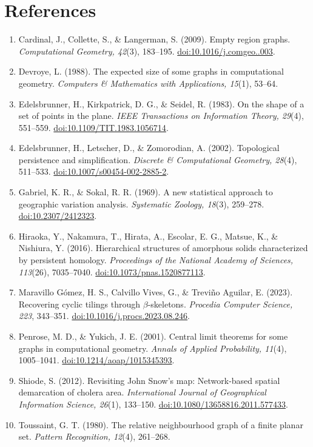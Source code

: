 \documentclass[10pt,letterpaper]{article}
\begin{document}
\section*{References}
{\footnotesize\setlength{\parskip}{1pt}
\begin{enumerate}\setlength{\itemsep}{1pt}\setlength{\parsep}{0pt}
\item Cardinal, J., Collette, S., \& Langerman, S. (2009). Empty region graphs. \emph{Computational Geometry, 42}(3), 183--195. \href{https://doi.org/10.1016/j.comgeo.2008.09.003}{doi:10.1016/j.comgeo..003}.
\item Devroye, L. (1988). The expected size of some graphs in computational geometry. \emph{Computers \& Mathematics with Applications, 15}(1), 53--64.
\item Edelsbrunner, H., Kirkpatrick, D. G., \& Seidel, R. (1983). On the shape of a set of points in the plane. \emph{IEEE Transactions on Information Theory, 29}(4), 551--559. \href{https://doi.org/10.1109/TIT.1983.1056714}{doi:10.1109/TIT.1983.1056714}.
\item Edelsbrunner, H., Letscher, D., \& Zomorodian, A. (2002). Topological persistence and simplification. \emph{Discrete \& Computational Geometry, 28}(4), 511--533. \href{https://doi.org/10.1007/s00454-002-2885-2}{doi:10.1007/s00454-002-2885-2}.
\item Gabriel, K. R., \& Sokal, R. R. (1969). A new statistical approach to geographic variation analysis. \emph{Systematic Zoology, 18}(3), 259--278. \href{https://doi.org/10.2307/2412323}{doi:10.2307/2412323}.
\item Hiraoka, Y., Nakamura, T., Hirata, A., Escolar, E. G., Matsue, K., \& Nishiura, Y. (2016). Hierarchical structures of amorphous solids characterized by persistent homology. \emph{Proceedings of the National Academy of Sciences, 113}(26), 7035--7040. \href{https://doi.org/10.1073/pnas.1520877113}{doi:10.1073/pnas.1520877113}.
\item Maravillo G\'omez, H. S., Calvillo Vives, G., \& Trevi\~no Aguilar, E. (2023). Recovering cyclic tilings through $\beta$-skeletons. \emph{Procedia Computer Science, 223}, 343--351. \href{https://doi.org/10.1016/j.procs.2023.08.246}{doi:10.1016/j.procs.2023.08.246}.
\item Penrose, M. D., \& Yukich, J. E. (2001). Central limit theorems for some graphs in computational geometry. \emph{Annals of Applied Probability, 11}(4), 1005--1041. \href{https://doi.org/10.1214/aoap/1015345393}{doi:10.1214/aoap/1015345393}.
\item Shiode, S. (2012). Revisiting John Snow's map: Network-based spatial demarcation of cholera area. \emph{International Journal of Geographical Information Science, 26}(1), 133--150. \href{https://doi.org/10.1080/13658816.2011.577433}{doi:10.1080/13658816.2011.577433}.
\item Toussaint, G. T. (1980). The relative neighbourhood graph of a finite planar set. \emph{Pattern Recognition, 12}(4), 261--268.
\end{enumerate}}
\end{document}

